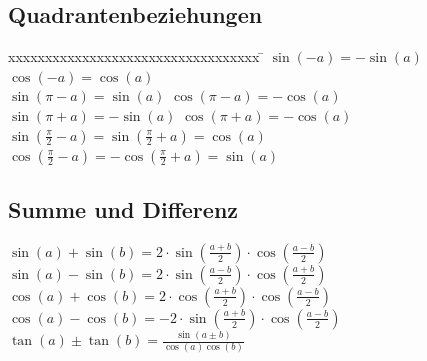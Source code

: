 \begin{minipage}[t]{6cm}
	\subsection{Quadrantenbeziehungen}
	\begin{tabbing}
		xxxxxxxxxxxxxxxxxxxxxxxxxxxxxxxxxx \= \kill
		$\sin(-a)=-\sin(a)$ \> $\cos(-a)=\cos(a)$\\
		$\sin(\pi - a)=\sin(a)$ \> $\cos(\pi - a)=-\cos(a)$\\
		$\sin(\pi + a)=-\sin(a)$ \> $\cos(\pi +a)=-\cos(a)$\\
		$\sin\left(\frac{\pi}{2}-a \right)=\sin\left(\frac{\pi}{2}+a \right)=\cos(a)$\\
		$\cos\left(\frac{\pi}{2}-a \right)=-\cos\left(\frac{\pi}{2}+a \right)=\sin(a)$  
	\end{tabbing}
			
	\subsection{Summe und Differenz}
		$\sin(a)+\sin(b)=2 \cdot \sin \left(\frac{a+b}{2}\right) \cdot
		\cos\left(\frac{a-b}{2}\right)$\\
		$\sin(a)-\sin(b)=2 \cdot \sin \left(\frac{a-b}{2}\right) \cdot
		\cos\left(\frac{a+b}{2}\right)$\\
		$\cos(a)+\cos(b)=2 \cdot \cos \left(\frac{a+b}{2}\right) \cdot
		\cos\left(\frac{a-b}{2}\right)$\\
		$\cos(a)-\cos(b)=-2 \cdot \sin \left(\frac{a+b}{2}\right) \cdot
		\cos\left(\frac{a-b}{2}\right)$\\
		$\tan(a) \pm \tan(b)=\frac{\sin(a \pm b)}{\cos(a)\cos(b)}$
\end{minipage}


